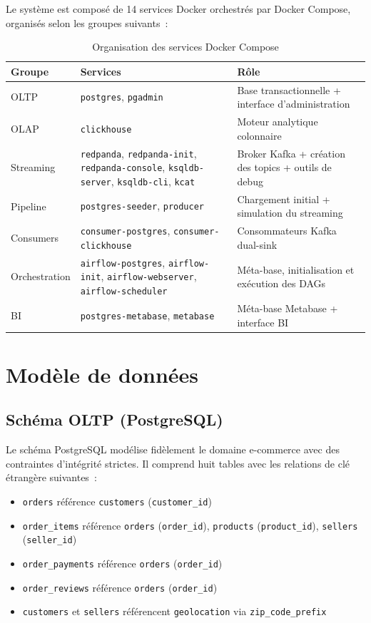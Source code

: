 Le système est composé de 14 services Docker orchestrés par Docker Compose, organisés selon les groupes suivants~:

\begin{table}[H]
\centering
\begin{tabular}{p{3.5cm} p{4cm} p{6cm}}
\toprule
\textbf{Groupe} & \textbf{Services} & \textbf{Rôle} \\
\midrule
OLTP & \texttt{postgres}, \texttt{pgadmin} & Base transactionnelle + interface d'administration \\
OLAP & \texttt{clickhouse} & Moteur analytique colonnaire \\
Streaming & \texttt{redpanda}, \texttt{redpanda-init}, \texttt{redpanda-console}, \texttt{ksqldb-server}, \texttt{ksqldb-cli}, \texttt{kcat} & Broker Kafka + création des topics + outils de debug \\
Pipeline & \texttt{postgres-seeder}, \texttt{producer} & Chargement initial + simulation du streaming \\
Consumers & \texttt{consumer-postgres}, \texttt{consumer-clickhouse} & Consommateurs Kafka dual-sink \\
Orchestration & \texttt{airflow-postgres}, \texttt{airflow-init}, \texttt{airflow-webserver}, \texttt{airflow-scheduler} & Méta-base, initialisation et exécution des DAGs \\
BI & \texttt{postgres-metabase}, \texttt{metabase} & Méta-base Metabase + interface BI \\
\bottomrule
\end{tabular}
\caption{Organisation des services Docker Compose}
\end{table}

\section{Modèle de données}

\subsection{Schéma OLTP (PostgreSQL)}

Le schéma PostgreSQL modélise fidèlement le domaine e-commerce avec des contraintes d'intégrité strictes. Il comprend huit tables avec les relations de clé étrangère suivantes~:

\begin{itemize}
  \setlength{\itemsep}{0.4em}
  \item \texttt{orders} référence \texttt{customers} (\texttt{customer\_id})
  \item \texttt{order\_items} référence \texttt{orders} (\texttt{order\_id}), \texttt{products} (\texttt{product\_id}), \texttt{sellers} (\texttt{seller\_id})
  \item \texttt{order\_payments} référence \texttt{orders} (\texttt{order\_id})
  \item \texttt{order\_reviews} référence \texttt{orders} (\texttt{order\_id})
  \item \texttt{customers} et \texttt{sellers} référencent \texttt{geolocation} via \texttt{zip\_code\_prefix}
\end{itemize}

